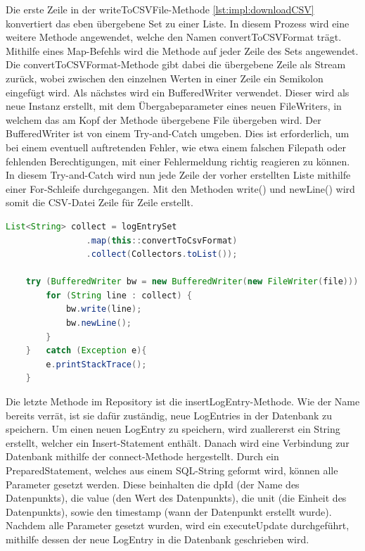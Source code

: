 Die erste Zeile in der writeToCSVFile-Methode \ref{lst:impl:downloadCSV} konvertiert das eben übergebene Set zu einer Liste. In diesem Prozess wird eine weitere Methode angewendet, welche den Namen convertToCSVFormat trägt. Mithilfe eines Map-Befehls wird die Methode auf jeder Zeile des Sets angewendet. Die convertToCSVFormat-Methode gibt dabei die übergebene Zeile als Stream zurück, wobei zwischen den einzelnen Werten in einer Zeile ein Semikolon eingefügt wird. Als nächstes wird ein BufferedWriter verwendet. Dieser wird als neue Instanz erstellt, mit dem Übergabeparameter eines neuen FileWriters, in welchem das am Kopf der Methode übergebene File übergeben wird. Der BufferedWriter ist von einem Try-and-Catch umgeben. Dies ist erforderlich, um bei einem eventuell auftretenden Fehler, wie etwa einem falschen Filepath oder fehlenden Berechtigungen, mit einer Fehlermeldung richtig reagieren zu können. In diesem Try-and-Catch wird nun jede Zeile der vorher erstellten Liste mithilfe einer For-Schleife durchgegangen. Mit den Methoden write() und newLine() wird somit die CSV-Datei Zeile für Zeile erstellt.

\begin{lstlisting}[language=java,caption=CSV-File herunterladen,label=lst:impl:downloadCSV]
    List<String> collect = logEntrySet
                .map(this::convertToCsvFormat)
                .collect(Collectors.toList());
        
    try (BufferedWriter bw = new BufferedWriter(new FileWriter(file))) {
        for (String line : collect) {
            bw.write(line);
            bw.newLine();
        }
    }   catch (Exception e){
        e.printStackTrace();
    }
\end{lstlisting}

Die letzte Methode im Repository ist die insertLogEntry-Methode. Wie der Name bereits verrät, ist sie dafür zuständig, neue LogEntries in der Datenbank zu speichern. Um einen neuen LogEntry zu speichern, wird zuallererst ein String erstellt, welcher ein Insert-Statement enthält.
Danach wird eine Verbindung zur Datenbank mithilfe der connect-Methode hergestellt. Durch ein PreparedStatement, welches aus einem SQL-String geformt wird, können alle Parameter gesetzt werden. Diese beinhalten die dpId (der Name des Datenpunkts), die value (den Wert des Datenpunkts), die unit (die Einheit des Datenpunkts), sowie den timestamp (wann der Datenpunkt erstellt wurde). Nachdem alle Parameter gesetzt wurden, wird ein executeUpdate durchgeführt, mithilfe dessen der neue LogEntry in die Datenbank geschrieben wird.
 
